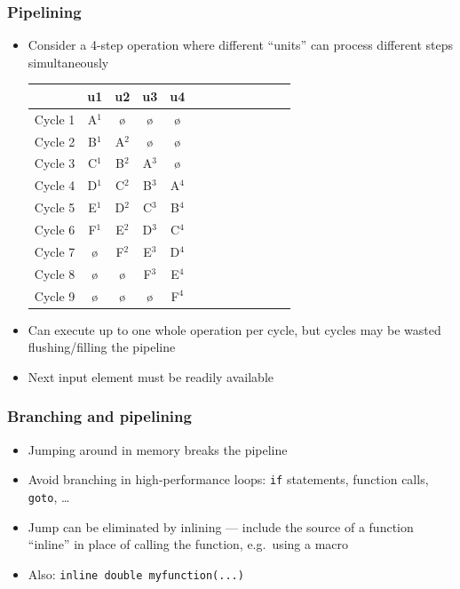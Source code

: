 \documentclass[usenames,dvipsnames,mathserif,compress]{beamer}
\begin{document}
\begin{frame}
  \frametitle{Pipelining}
  \begin{itemize}
  \item Consider a 4-step operation where different ``units'' can process
    different steps simultaneously
    \begin{table}
    \begin{tabular}{c|cccccccccccc}
      & u1 &u2&u3&u4\\\hline
      Cycle 1 & A$^1$ &ø&ø&ø \\
      Cycle 2 & B$^1$ & A$^2$ &ø&ø \\
      Cycle 3 & C$^1$ & B$^2$ & A$^3$ &ø \\
      Cycle 4 & D$^1$ & C$^2$ & B$^3$ & A$^4$  \\
      Cycle 5 & E$^1$ & D$^2$ & C$^3$ & B$^4$   \\
      Cycle 6 & F$^1$ & E$^2$ & D$^3$ & C$^4$  \\
      Cycle 7 & ø     & F$^2$ & E$^3$ & D$^4$  \\
      Cycle 8 & ø & ø & F$^3$ & E$^4$  \\
      Cycle 9 & ø & ø & ø & F$^4$  \\
    \end{tabular}
    \end{table}
  \item Can execute up to one whole operation per cycle, but cycles
    may be wasted flushing/filling the pipeline
  \item Next input element must be readily available
  \end{itemize}
\end{frame}

\begin{frame}
  \frametitle{Branching and pipelining}
  \begin{itemize}
  \item Jumping around in memory breaks the pipeline
  \item Avoid \alert{branching} in high-performance loops: \texttt{if} statements, function calls, \texttt{goto}, \ldots
  \item Jump can be eliminated by \alert{inlining} --- include the source of a function ``inline'' in place of calling the function, e.g.\ using a macro
  \item Also: \lstinline{inline double myfunction(...)}
  \end{itemize}
\end{frame}
\end{document}
